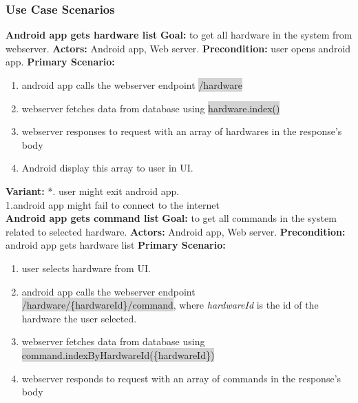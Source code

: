\documentclass[12pt, oneside, a4paper]{book}
\newcommand{\code}[1]{{\color{red}\colorbox{lightgray}{#1}}}
\newcommand\boldcolor[1]{\textcolor{bold}{\textbf{#1}}}
\begin{document}
				\newpage\subsubsection{Use Case Scenarios}
				
				\boldcolor{Android app gets hardware list}
				\newline\textbf{Goal:} to get all hardware in the system from webserver.
				\newline\textbf{Actors:} Android app, Web server.
				\newline\textbf{Precondition:} user opens android app.
				\newline\textbf{Primary Scenario:}	
				\begin{enumerate}[label*=\arabic*.]
					\item android app calls the webserver endpoint \code{/hardware}
					\item webserver fetches data from database using \code{hardware.index()}
					\item webserver responses to request with an array of hardwares in the response's body
					\item Android display this array to user in UI.
				\end{enumerate}
				\textbf{Variant:}\newline
				\hspace*{5mm}*. user might exit android app. \\
				\hspace*{5mm}1.android app might fail to connect to the internet \\
				\newline\boldcolor{Android app gets command list}
				\newline\textbf{Goal:} to get all commands in the system related to selected hardware.
				\newline\textbf{Actors:} Android app, Web server.
				\newline\textbf{Precondition:} android app gets hardware list
				\newline\textbf{Primary Scenario:}	
				\begin{enumerate}[label*=\arabic*.]
					\item user selects hardware from UI.
					\item android app calls the webserver endpoint \code{/hardware/\{hardwareId\}/command}, where \textit{hardwareId} is the id of the hardware the user selected.
					\item webserver fetches data from database using \code{command.indexByHardwareId(\{hardwareId\})}
					\item webserver responds to request with an array of commands in the response's body
				\end{enumerate}
\end{document}
